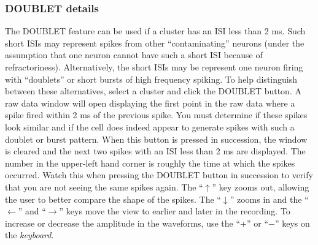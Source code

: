 \documentclass[12pt]{article}
\begin{document}
\subsubsection{\sf DOUBLET details}
The {\sf DOUBLET} feature can be used if a cluster has an ISI less
than 2 ms. Such short ISIs may represent spikes from other
``contaminating'' neurons (under the assumption that one neuron cannot
have such a short ISI because of refractoriness). Alternatively, the
short ISIs may be represent one neuron firing with ``doublets'' or
short bursts of high frequency spiking. To help distinguish between
these alternatives, select a cluster and click the {\sf DOUBLET}
button. A raw data window will open displaying the first point in the
raw data where a spike fired within 2 ms of the previous spike. You
must determine if these spikes look similar and if the cell does
indeed appear to generate spikes with such a doublet or burst
pattern. When this button is pressed in succession, the window is
cleared and the next two spikes with an ISI less than 2 ms are
displayed. The number in the upper-left hand corner is roughly the
time at which the spikes occurred. Watch this when pressing the {\sf
  DOUBLET} button in succession to verify that you are not seeing the
same spikes again. The ``$\uparrow$'' key zooms out, allowing the user
to better compare the shape of the spikes. The ``$\downarrow$'' zooms
in and the ``$\leftarrow$'' and ``$\rightarrow$'' keys move the view
to earlier and later in the recording. To increase or decrease the
amplitude in the waveforms, use the ``+'' or ``$-${}'' keys on the
\textit{keyboard}.
\end{document}
